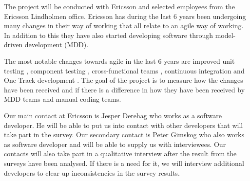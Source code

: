 \documentclass[ProjectPlan_innit.tex]{subfiles}
\begin{document}
The project will be conducted with Ericsson and selected employees from the Ericsson Lindholmen office. Ericsson has during the last 6 years been undergoing many changes in their way of working that all relate to an agile way of working. In addition to this they have also started developing software through model-driven development (MDD). 
\smallskip



The most notable changes towards agile in the last 6 years are improved unit testing \cite{UNIT:ENGELS:2007}, component testing \cite{COMP:GAO:2000}, cross-functional teams \cite{XFT:GHOBADI:2011}, continuous integration \cite{CI:ABDUL:2012} and One Track development \cite{ONETRACK:HRIBAR:2008}. The goal of the project is to measure how the changes have been received and if there is a difference in how they have been received by MDD teams and manual coding teams. 
\smallskip

Our main contact at Ericsson is Jesper Derehag who works as a software developer. He will be able to put us into contact with other developers that will take part in the survey. Our secondary contact is Peter Gimskog who also works as software developer and will be able to supply us with interviewees. Our contacts will also take part in a qualitative interview after the result from the surveys have been analysed. If there is a need for it, we will interview additional developers to clear up inconsistencies in the survey results. 
\end{document}
